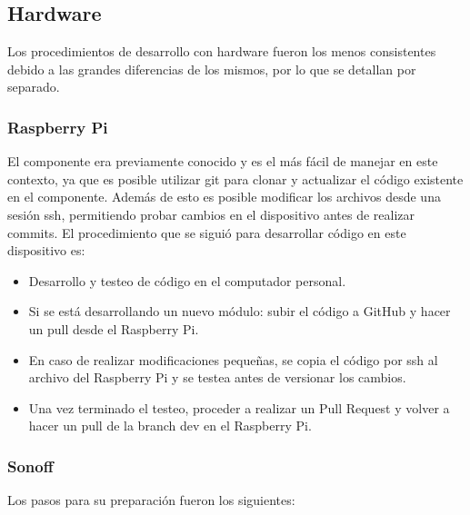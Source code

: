 \subsection{Hardware}

Los procedimientos de desarrollo con hardware fueron los menos consistentes debido a las grandes diferencias de los mismos, por lo que se detallan por separado.

\subsubsection{Raspberry Pi}

El componente era previamente conocido y es el más fácil de manejar en este contexto, ya que es posible utilizar git para clonar y actualizar el código existente en el componente. Además de esto es posible modificar los archivos desde una sesión ssh, permitiendo probar cambios en el dispositivo antes de realizar commits. El procedimiento que se siguió para desarrollar código en este dispositivo es:

\begin{itemize}
\item Desarrollo y testeo de código en el computador personal.
\item Si se está desarrollando un nuevo módulo: subir el código a GitHub y hacer un pull desde el Raspberry Pi.
\item En caso de realizar modificaciones pequeñas, se copia el código por ssh al archivo del Raspberry Pi y se testea antes de versionar los cambios.
\item Una vez terminado el testeo, proceder a realizar un Pull Request y volver a hacer un pull de la branch dev en el Raspberry Pi.

\end{itemize}

\subsubsection{Sonoff}

Los pasos para su preparación fueron los siguientes:


